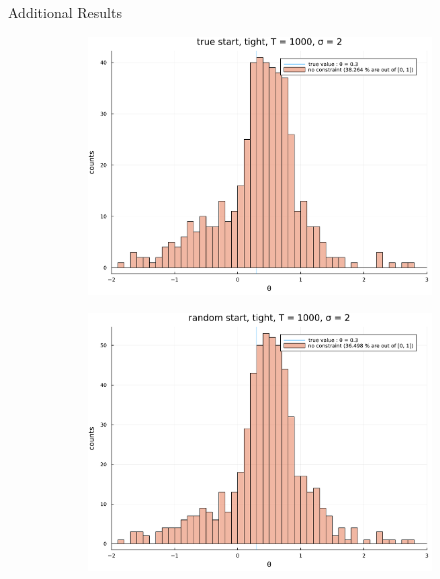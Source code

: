 \documentclass[aspectratio = 169]{beamer}
\theoremstyle{definition}
\begin{document}
\begin{frame}{Additional Results}
\begin{figure}
    \begin{subfigure}[b]{0.475\textwidth}
         \centering
         \includegraphics[width=\textwidth]{figuretable/tight/histogram_loglinear_loglinear_n_1000_sigma_2_non_constraint_true_start.pdf}
     \end{subfigure}
     \hfill
     \begin{subfigure}[b]{0.475\textwidth}
         \centering
         \includegraphics[width=\textwidth]{figuretable/tight/histogram_loglinear_loglinear_n_1000_sigma_2_non_constraint_random_start.pdf}
     \end{subfigure}
\end{figure}
\end{frame}
\end{document}
